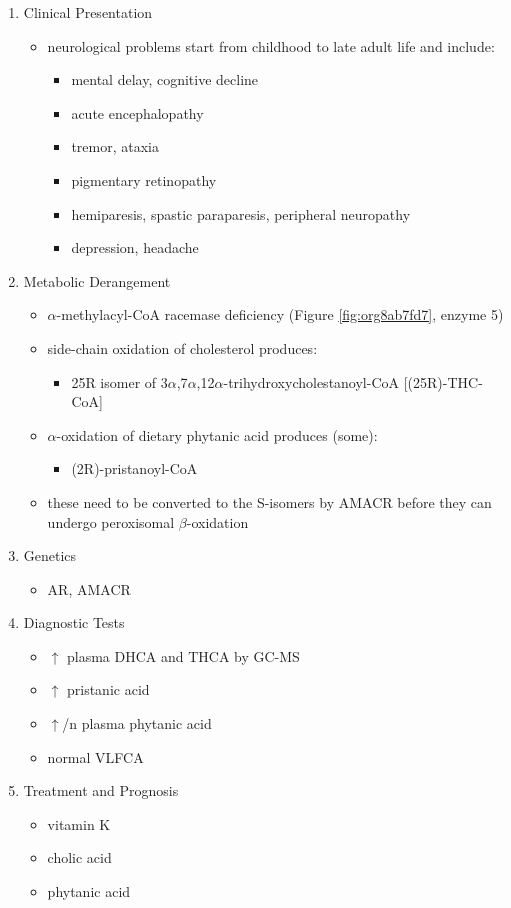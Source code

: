 \documentclass{scrartcl}
\begin{document}
\begin{enumerate}
\item Clinical Presentation
\label{sec:orgdd8d75e}
\begin{itemize}
\item neurological problems start from childhood to late adult life and
include:
\begin{itemize}
\item mental delay, cognitive decline
\item acute encephalopathy
\item tremor, ataxia
\item pigmentary retinopathy
\item hemiparesis, spastic paraparesis, peripheral neuropathy
\item depression, headache
\end{itemize}
\end{itemize}

\item Metabolic Derangement
\label{sec:orgd96d1d0}
\begin{itemize}
\item \(\alpha\)-methylacyl-CoA racemase deficiency (Figure \ref{fig:org8ab7fd7}, enzyme 5)
\item side-chain oxidation of cholesterol produces:
\begin{itemize}
\item 25R isomer of 3\(\alpha\),7\(\alpha\),12\(\alpha\)-trihydroxycholestanoyl-CoA [(25R)-THC-CoA]
\end{itemize}
\item \(\alpha\)-oxidation of dietary phytanic acid produces (some):
\begin{itemize}
\item (2R)-pristanoyl-CoA
\end{itemize}
\item these need to be converted to the S-isomers by AMACR before they can
undergo peroxisomal \(\beta\)-oxidation
\end{itemize}

\item Genetics
\label{sec:org965ebbb}
\begin{itemize}
\item AR, AMACR
\end{itemize}

\item Diagnostic Tests
\label{sec:org750bef3}
\begin{itemize}
\item \(\uparrow\) plasma DHCA and THCA by GC-MS
\item \(\uparrow\) pristanic acid
\item \(\uparrow\)/n plasma phytanic acid
\item normal VLFCA
\end{itemize}

\item Treatment and Prognosis
\label{sec:orgd5ff563}
\begin{itemize}
\item vitamin K
\item cholic acid
\item phytanic acid
\end{itemize}
\end{enumerate}
\end{document}
